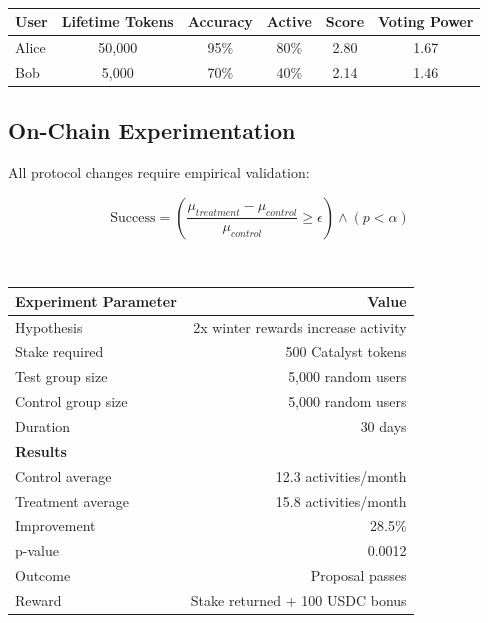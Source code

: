 \documentclass[11pt,letterpaper]{article}
\begin{document}
~


\begin{table}[H]
\centering
\begin{tabular}{lccccc}
\toprule
\textbf{User} & \textbf{Lifetime Tokens} & \textbf{Accuracy} & \textbf{Active} & \textbf{Score} & \textbf{Voting Power} \\
\midrule
Alice & 50,000 & 95\% & 80\% & 2.80 & 1.67 \\
Bob & 5,000 & 70\% & 40\% & 2.14 & 1.46 \\
\bottomrule
\end{tabular}
\end{table}


\subsection{On-Chain Experimentation}

All protocol changes require empirical validation:

\begin{equation}
\text{Success} = \left(\frac{\mu_{treatment} - \mu_{control}}{\mu_{control}} \geq \epsilon\right) \land (p < \alpha)
\end{equation}


~


\begin{table}[H]
\centering
\begin{tabular}{lr}
\toprule
\textbf{Experiment Parameter} & \textbf{Value} \\
\midrule
Hypothesis & 2x winter rewards increase activity \\
Stake required & 500 Catalyst tokens \\
Test group size & 5,000 random users \\
Control group size & 5,000 random users \\
Duration & 30 days \\
\midrule
\textbf{Results} & \\
Control average & 12.3 activities/month \\
Treatment average & 15.8 activities/month \\
Improvement & 28.5\% \\
p-value & 0.0012 \\
\midrule
Outcome & Proposal passes \\
Reward & Stake returned + 100 USDC bonus \\
\bottomrule
\end{tabular}
\end{table}
\end{document}
